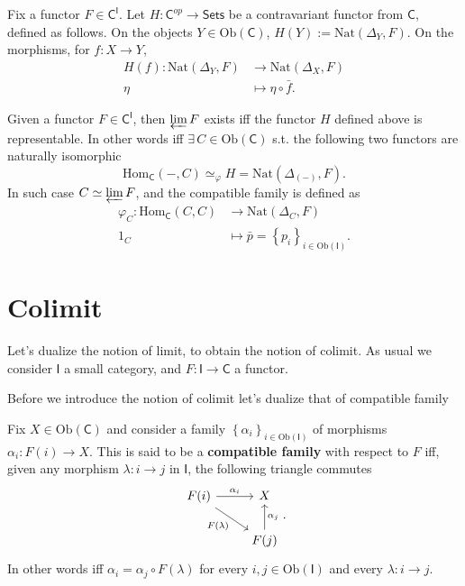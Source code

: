 \begin{defn}
	Fix a functor $F \in \mathsf{C}^{\mathsf{I}}$.
	Let $H: \mathsf{C}^{op} \to \mathsf{Sets}$ be a contravariant functor from $\mathsf{C}$, defined as follows.
	On the objects $Y \in \mathrm{Ob} \left(\mathsf{C}\right)$, 
	$H(Y) := \mathrm{Nat} \left( \Delta_Y, F \right)$.
	On the morphisms, for $f: X \to Y$, 
	 \begin{align}
		 H(f): \mathrm{Nat} \left( \Delta_Y, F \right) &\to \mathrm{Nat} \left( \Delta_X, F \right) \\
		 \eta &\mapsto \eta \circ \bar{f}
	.\end{align} 
\end{defn}

\begin{prop}
	Given a functor $F \in \mathsf{C}^{\mathsf{I}}$, then
	$\varprojlim F$ exists iff the functor $H$ defined above is representable.
	In other words iff $\exists\, C \in \mathrm{Ob} \left(\mathsf{C}\right)$ s.t.
	the following two functors are naturally isomorphic
	\begin{equation}
	\mathrm{Hom}_{\mathsf{C}} \left( -, C \right) \simeq_{\varphi} H = \mathrm{Nat} \left( \Delta_{(-)}, F \right)
	.\end{equation} 
	In such case $C \simeq \varprojlim F$, and the compatible family is defined as
	\begin{align}
		\varphi_C: \mathrm{Hom}_{\mathsf{C}} \left( C, C \right) &\to \mathrm{Nat} \left( \Delta_C, F \right) \\
		1_C &\mapsto \bar{p} = \left\{ p_i \right\}_{i \in \mathrm{Ob} \left(\mathsf{I}\right)}
	.\end{align} 
\end{prop} 

\section{Colimit}
Let's dualize the notion of limit, to obtain the notion of colimit.
As usual we consider $\mathsf{I}$ a small category, and $F: \mathsf{I} \to \mathsf{C}$ a functor.

Before we introduce the notion of colimit let's dualize that of compatible family
\begin{defn}
	Fix $X \in \mathrm{Ob} \left(\mathsf{C}\right)$ and
	consider a family $\left\{ \alpha_i \right\}_{i \in \mathrm{Ob} \left(\mathsf{I}\right)}$ of morphisms $\alpha_i: F(i) \to X$.
	This is said to be a \textbf{compatible family} with respect to $F$ iff, given any morphism $\lambda: i \to j$ in $\mathsf{I}$,
	the following triangle commutes
	\begin{equation}
	\begin{tikzcd}
		F(i) \arrow[r, "\alpha_i", rightarrow] \arrow[rd, "F(\lambda)"', rightarrow] &
		X \\
		&
		F(j) \arrow[u, "\alpha_j"', rightarrow] 
	\end{tikzcd}
	.\end{equation} 
	In other words iff $\alpha_i = \alpha_j \circ F(\lambda)$ for every $i, j \in \mathrm{Ob} \left(\mathsf{I}\right)$ and every $\lambda: i \to j$.
\end{defn}


